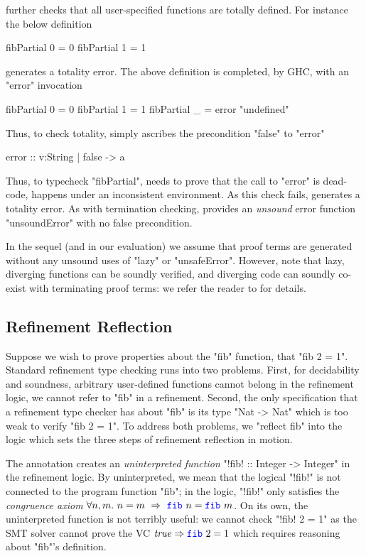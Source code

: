 \toolname further checks that all user-specified functions are totally defined. 
For instance the below definition 
%
\begin{mcode}
    fibPartial 0 = 0 
    fibPartial 1 = 1 
\end{mcode}
generates a totality error. 
%
The above definition is completed, by GHC, 
with an "error" invocation
%
\begin{mcode}
    fibPartial 0 = 0 
    fibPartial 1 = 1 
    fibPartial _ = error "undefined" 
\end{mcode}
%
Thus, to check totality, \toolname simply ascribes the precondition "false" to "error"
%
\begin{mcode}
    error :: { v:String | false } -> a
\end{mcode}
%
Thus, to typecheck "fibPartial", \toolname needs to prove that the call to "error" 
is dead-code, \ie happens under an inconsistent environment. As this check fails, 
\toolname generates a totality error. 
%
As with termination checking,
\toolname provides an \textit{unsound}
error function "unsoundError" with no false precondition.

In the sequel (and in our evaluation) 
we assume that proof terms are generated without 
any unsound uses of "lazy" or "unsafeError".
%
However, note that lazy, diverging functions 
can be soundly verified, and diverging code 
can soundly co-exist with terminating proof 
terms: we refer the reader to \citet{Vazou14} for details.

\subsection{Refinement Reflection}\label{subsec:overview:reflection}

Suppose we wish to prove properties about the "fib"
function, \eg that "{fib 2 = 1}".
%
Standard refinement type checking runs into two problems.
%
First, for decidability and soundness, arbitrary
user-defined functions cannot belong in the refinement
logic, \ie we cannot {refer} to "fib" in a refinement.
%
Second, the only specification that a refinement type checker
has about "fib" is its type "Nat -> Nat" which is
too weak to verify "{fib 2 = 1}".
%
To address both problems, we "reflect fib" into the
logic which sets the three steps of refinement
reflection in motion.



%
The annotation creates an \emph{uninterpreted function}
"!fib! :: Integer -> Integer" in the refinement logic.
%
By uninterpreted, we mean that the logical "!fib!"
is not connected to the program function
"fib"; in the logic, "!fib!" only satisfies the
\emph{congruence axiom}
%
$\forall n, m.\ n = m\ \Rightarrow\ \fib{n} = \fib{m}$.
%
On its own, the uninterpreted function is
not terribly useful: we cannot check "{!fib! 2 = 1}"
as the SMT solver cannot prove the
VC 
$\ttrue \Rightarrow \fib{2} = 1$ 
which requires reasoning about "fib"'s
definition.

